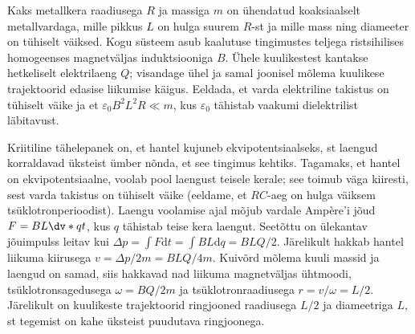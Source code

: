 
Kaks metallkera raadiusega $R$ ja massiga $m$ on ühendatud koaksiaalselt metallvardaga, mille pikkus $L$ on hulga suurem $R$-st ja mille mass ning diameeter on tühiselt väiksed. Kogu süsteem asub kaalutuse tingimustes teljega ristsihilises homogeenses magnetväljas induktsiooniga $B$. Ühele kuulikestest kantakse hetkeliselt elektrilaeng $Q$; visandage ühel ja samal joonisel mõlema kuulikese trajektoorid edasise liikumise käigus. Eeldada, et varda elektriline takistus on tühiselt väike ja et $\varepsilon_0B^2L^2R\ll m$, kus $\varepsilon_0$ tähistab vaakumi dielektrilist läbitavust.



\hint
Kriitiline tähelepanek on, et hantel kujuneb ekvipotentsiaalseks, st laengud korraldavad üksteist ümber nõnda, et see tingimus kehtiks.\solu
Tagamaks, et hantel on ekvipotentsiaalne, voolab pool laengust teisele kerale; see toimub väga kiiresti, sest varda takistus on tühiselt väike (eeldame, et $RC$-aeg on hulga väiksem tsüklotronperioodist). Laengu voolamise ajal mõjub vardale Ampère'i jõud $F=BL\dv*{q}{t}$, kus $q$ tähistab teise kera laengut. Seetõttu on ülekantav jõuimpulss leitav kui $\Delta p=\int F\mathrm dt=\int BL\mathrm dq = BLQ/2$. Järelikult hakkab hantel liikuma kiirusega $v=\Delta p/2m=BLQ/4m$. Kuivõrd mõlema kuuli massid ja laengud on samad, siis hakkavad nad liikuma magnetväljas ühtmoodi, tsüklotronsagedusega $\omega=BQ/2m$ ja tsüklotronraadiusega $r=v/\omega=L/2$. Järelikult on kuulikeste trajektoorid ringjooned raadiusega $L/2$ ja diameetriga $L$, st tegemist on kahe üksteist puudutava ringjoonega.\probend